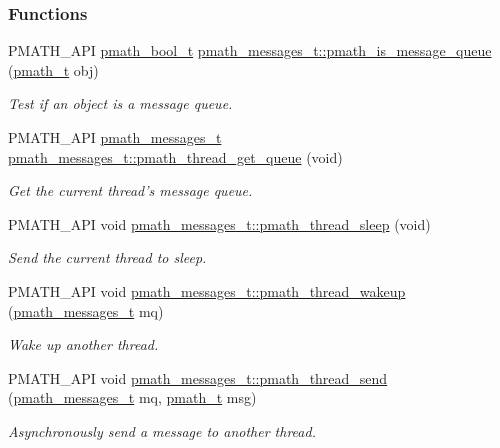 \subsubsection*{Functions}
\begin{CompactItemize}
\item 
PMATH\_\-API \hyperlink{group__general__types_gc92090cb0b56345d6c379ed2341d4ef4}{pmath\_\-bool\_\-t} \hyperlink{group__threadmsg_g93b45ad8c3063c94602c8bbaaf3c2613}{pmath\_\-messages\_\-t::pmath\_\-is\_\-message\_\-queue} (\hyperlink{classpmath__t}{pmath\_\-t} obj)
\begin{CompactList}\small\item\em Test if an object is a message queue. \item\end{CompactList}\item 
PMATH\_\-API \hyperlink{classpmath__messages__t}{pmath\_\-messages\_\-t} \hyperlink{group__threadmsg_gf4d69db0ffe06846e57df7cadcd3dab6}{pmath\_\-messages\_\-t::pmath\_\-thread\_\-get\_\-queue} (void)
\begin{CompactList}\small\item\em Get the current thread's message queue. \item\end{CompactList}\item 
PMATH\_\-API void \hyperlink{group__threadmsg_gce6da6e34b0aeab35094ddccdd9a3e55}{pmath\_\-messages\_\-t::pmath\_\-thread\_\-sleep} (void)
\begin{CompactList}\small\item\em Send the current thread to sleep. \item\end{CompactList}\item 
PMATH\_\-API void \hyperlink{group__threadmsg_gbf90d49f5c42ccaa736ae5e56af6a4a6}{pmath\_\-messages\_\-t::pmath\_\-thread\_\-wakeup} (\hyperlink{classpmath__messages__t}{pmath\_\-messages\_\-t} mq)
\begin{CompactList}\small\item\em Wake up another thread. \item\end{CompactList}\item 
PMATH\_\-API void \hyperlink{group__threadmsg_ga3867a708fb07b86e017e8f201ef7edd}{pmath\_\-messages\_\-t::pmath\_\-thread\_\-send} (\hyperlink{classpmath__messages__t}{pmath\_\-messages\_\-t} mq, \hyperlink{classpmath__t}{pmath\_\-t} msg)
\begin{CompactList}\small\item\em Asynchronously send a message to another thread. \item\end{CompactList}\item 

\end{CompactItemize}
